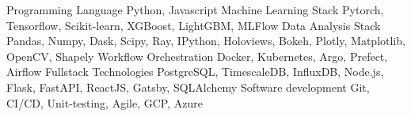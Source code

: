 

\begin{cvskills}

  \cvskill
    {Programming Language}   
    {Python, Javascript}
  \cvskill
    {Machine Learning Stack}   
    {Pytorch, Tensorflow, Scikit-learn, XGBoost, LightGBM, MLFlow}
  \cvskill
    {Data Analysis Stack}   
    {Pandas, Numpy, Dask, Scipy, Ray, IPython, Holoviews, Bokeh, Plotly, Matplotlib, OpenCV, Shapely}
  \cvskill
    {Workflow Orchestration}
    {Docker, Kubernetes, Argo, Prefect, Airflow}
  \cvskill
    {Fullstack Technologies}   
    {PostgreSQL, TimescaleDB, InfluxDB, Node.js, Flask, FastAPI, ReactJS, Gatsby, SQLAlchemy}
  \cvskill
    {Software development}   
    {Git, CI/CD, Unit-testing, Agile, GCP, Azure}
\end{cvskills}
